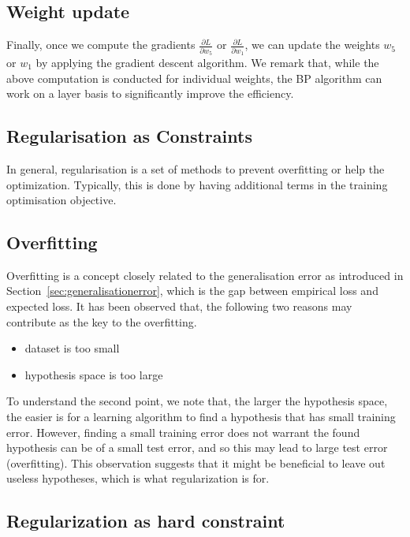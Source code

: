 \subsection*{Weight update}

Finally, once we compute the gradients $\displaystyle  \frac{{\partial L}}{{\partial w_5}}$ or $\displaystyle  \frac{{\partial L}}{{\partial w_1}}$, we can update the weights $w_5$ or $w_1$ by applying the gradient descent algorithm. We remark that, while the above computation is conducted for individual weights, the BP algorithm can work on a layer basis to significantly improve the efficiency. 

\subsection{Regularisation as Constraints}

In general, regularisation is a set of methods to  prevent overfitting or help the optimization. Typically, this is done by having additional terms in the training optimisation objective. 

\subsection*{Overfitting}

Overfitting is a concept closely related to the generalisation error as introduced in Section~\ref{sec:generalisationerror}, which is the gap between empirical loss and expected loss. 
It has been observed that, the following two reasons may contribute as the key to the overfitting. 

\begin{itemize}
    \item dataset is too small
    \item hypothesis space is too large
\end{itemize}

To understand the second point, we note that, the larger the hypothesis space, the easier is for a learning algorithm to find a hypothesis that has small training error. However, finding a small training error does not warrant the found hypothesis can be of a small test error, and so this may lead to large test error (overfitting). This observation suggests that it might be beneficial to leave out useless hypotheses, which is what regularization is for. 

\subsection*{Regularization as hard constraint}

